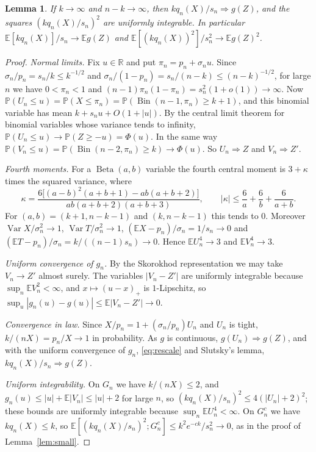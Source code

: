 \documentclass[11pt]{amsart}
\newtheorem{lemma}[theorem]{Lemma}
\theoremstyle{remark}
\numberwithin{equation}{section}
\newcommand{\E}{\mathbb E}
\newcommand{\Pp}{\mathbb P}
\newcommand{\R}{\mathbb R}
\newcommand{\1}{\mathbf 1}
\newcommand{\Var}{\operatorname{Var}}
\newcommand{\Bin}{\operatorname{Bin}}
\newcommand{\Bet}{\operatorname{Beta}}
\begin{document}
\begin{lemma}\label{lem:condmean}
If $k\to\infty$ and $n-k\to\infty$, then $kq_n(X)/s_n\Rightarrow g(Z)$, and the squares $(kq_n(X)/s_n)^2$ are uniformly integrable. In particular $\E[kq_n(X)]/s_n\to\E g(Z)$ and $\E[(kq_n(X))^2]/s_n^2\to\E g(Z)^2$.
\end{lemma}

\begin{proof}
\emph{Normal limits.} Fix $u\in\R$ and put $\pi_n=p_n+\sigma_nu$. Since $\sigma_n/p_n=s_n/k\le k^{-1/2}$ and $\sigma_n/(1-p_n)=s_n/(n-k)\le(n-k)^{-1/2}$, for large $n$ we have $0<\pi_n<1$ and $(n-1)\pi_n(1-\pi_n)=s_n^2(1+o(1))\to\infty$. Now $\Pp(U_n\le u)=\Pp(X\le\pi_n)=\Pp(\Bin(n-1,\pi_n)\ge k+1)$, and this binomial variable has mean $k+s_nu+O(1+|u|)$. By the central limit theorem for binomial variables whose variance tends to infinity, $\Pp(U_n\le u)\to\Pp(Z\ge-u)=\Phi(u)$. In the same way $\Pp(V_n\le u)=\Pp(\Bin(n-2,\pi_n)\ge k)\to\Phi(u)$. So $U_n\Rightarrow Z$ and $V_n\Rightarrow Z'$.

\emph{Fourth moments.} For a $\Bet(a,b)$ variable the fourth central moment is $3+\kappa$ times the squared variance, where
\[
\kappa=\frac{6\bigl[(a-b)^2(a+b+1)-ab(a+b+2)\bigr]}{ab(a+b+2)(a+b+3)},\qquad |\kappa|\le\frac6a+\frac6b+\frac6{a+b}.
\]
For $(a,b)=(k+1,n-k-1)$ and $(k,n-k-1)$ this tends to $0$. Moreover $\Var X/\sigma_n^2\to1$, $\Var T/\sigma_n^2\to1$, $(\E X-p_n)/\sigma_n=1/s_n\to0$ and $(\E T-p_n)/\sigma_n=k/((n-1)s_n)\to0$. Hence $\E U_n^4\to3$ and $\E V_n^4\to3$.

\emph{Uniform convergence of $g_n$.} By the Skorokhod representation we may take $V_n\to Z'$ almost surely. The variables $|V_n-Z'|$ are uniformly integrable because $\sup_n\E V_n^2<\infty$, and $x\mapsto(u-x)_+$ is $1$-Lipschitz, so $\sup_u|g_n(u)-g(u)|\le\E|V_n-Z'|\to0$.

\emph{Convergence in law.} Since $X/p_n=1+(\sigma_n/p_n)U_n$ and $U_n$ is tight, $k/(nX)=p_n/X\to1$ in probability. As $g$ is continuous, $g(U_n)\Rightarrow g(Z)$, and with the uniform convergence of $g_n$, \eqref{eq:rescale} and Slutsky's lemma, $kq_n(X)/s_n\Rightarrow g(Z)$.

\emph{Uniform integrability.} On $G_n$ we have $k/(nX)\le2$, and $g_n(u)\le|u|+\E|V_n|\le|u|+2$ for large $n$, so $(kq_n(X)/s_n)^2\le4(|U_n|+2)^2$; these bounds are uniformly integrable because $\sup_n\E U_n^4<\infty$. On $G_n^c$ we have $kq_n(X)\le k$, so $\E[(kq_n(X)/s_n)^2;G_n^c]\le k^2e^{-ck}/s_n^2\to0$, as in the proof of Lemma~\ref{lem:small}.
\end{proof}
\end{document}
